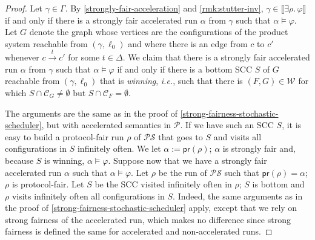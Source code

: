 \documentclass[10pt,a4paper]{article}
\newcommand{\deff}{:=}
\newcommand{\prot}{\mathcal{P}}
\newcommand{\accrun}{\alpha}
\newcommand{\config}{\gamma}
\newcommand{\configs}{\Gamma}
\newcommand{\step}[1]{\xrightarrow{#1}}
\newcommand{\run}{\rho}
\newcommand{\transitions}{\Delta}
\newcommand{\satset}[1]{\llbracket {#1} \rrbracket}
\newcommand*{\abuchistate}{\ell}
\newcommand*{\bstate}{\abuchistate}
\newcommand*{\binitstate}{\bstate_0}
\newcommand*{\bwinning}{\mathcal{W}}
\newcommand{\prodsystem}{\mathcal{PS}}
\newcommand{\prodconfigs}{\mathcal{C}}
\newcommand{\prodconfigsproj}[1]{\prodconfigs_{#1}}
\newcommand{\prodconfig}{c}
\newcommand{\protproj}[1]{\mathsf{pr}(#1)}
\begin{document}
\begin{proof}
	Let \(\config \in \configs\).
	By \cref{strongly-fair-acceleration} and \cref{rmk:stutter-inv}, \(\config \in \satset{\exists \run .
		\, \varphi}\) if and only if there is a strongly fair accelerated run \(\accrun\) from \(\config\) such that \(\accrun \models \varphi\).
	Let \(G\) denote the graph whose vertices are the configurations of the product system reachable from \((\config, \binitstate)\) and where there is an edge from \(\prodconfig\) to \(\prodconfig'\) whenever \(\prodconfig \step{t} \prodconfig'\) for some \(t \in \transitions\).
	We claim that there is a strongly fair accelerated run \(\accrun\) from \(\config\) such that \(\accrun \models \varphi\) if and only if there is a bottom SCC \(S\) of \(G\) reachable from \((\config, \binitstate)\) that is \emph{winning}, \emph{i.e.}, such that there is \((F,G) \in \bwinning\) for which \(S \cap \prodconfigsproj{G} \ne \emptyset\) but \(S \cap \prodconfigsproj{F} = \emptyset\).

	The arguments are the same as in the proof of \cref{strong-fairness-stochastic-scheduler}, but with accelerated semantics in \(\prot\).
	If we have such an SCC \(S\), it is easy to build a protocol-fair run \(\run\) of \(\prodsystem\) that goes to \(S\) and visits all configurations in \(S\) infinitely often.
	We let \(\accrun \deff \protproj{\run}\); \(\accrun\) is strongly fair and, because \(S\) is winning, \(\accrun \models \varphi\).
	Suppose now that we have a strongly fair accelerated run \(\accrun\) such that \(\accrun \models \varphi\).
	Let \(\run\) be the run of \(\prodsystem\) such that \(\protproj{\run} = \accrun\); \(\run\) is protocol-fair.
	Let \(S\) be the SCC visited infinitely often in \(\run\); \(S\) is bottom and \(\run\) visits infinitely often all configurations in \(S\).
	Indeed, the same arguments as in the proof of \cref{strong-fairness-stochastic-scheduler} apply, except that we rely on strong fairness of the accelerated run, which makes no difference since strong fairness is defined the same for accelerated and non-accelerated runs.


\end{proof}
\end{document}
